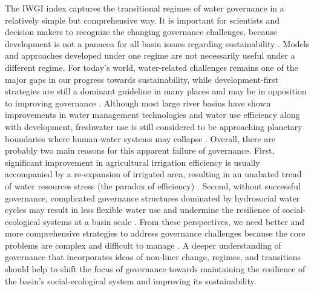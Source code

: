 \documentclass[9pt, twocolumn, twoside, lineno]{pnas-new}
\begin{document}
The IWGI index captures the transitional regimes of water governance in a relatively simple but comprehensive way.
It is important for scientists and decision makers to recognize the changing governance challenges, because development is not a panacea for all basin issues regarding sustainability 
\cite{cummingLinkingEconomicGrowth2018,reyersSocialEcologicalSystemsInsights2018}.
Models and approaches developed under one regime are not necessarily useful under a different regime.
For today's world, water-related challenges remains one of the major gaps in our progress towards sustainability, while development-first strategies are still a dominant guideline in many places and may be in opposition to improving governance 
\cite{xu2020,liu2017,greveGlobalAssessmentWater2018}. 
Although most large river basins have shown improvements in water management technologies and water use efficiency along with development, freshwater use is still considered to be approaching planetary boundaries where human-water systems may collapse 
\cite{li2020a,degraafEnvironmentalflowlimits2019,huggins2020}.
Overall, there are probably two main reasons for this apparent failure of governance.
First, significant improvement in agricultural irrigation efficiency is usually accompanied by a re-expansion of irrigated area, resulting in an unabated trend of water resources stress (the paradox of efficiency) 
\cite{grafton2018}. 
Second, without successful governance, complicated governance structures dominated by hydrosocial water cycles may result in less flexible water use and undermine the resilience of social-ecological systems at a basin scale
\cite{qinFlexibilityintensityglobal2019,levia2020,grill2019}.
From these perspectives, we need better and more comprehensive strategies to address governance challenges because the core problems are complex and difficult to manage 
\cite{steffen2020,muneepeerakul2020,bodinCollaborativeEnvironmentalGovernance2017,biermann2012}. 
A deeper understanding of governance that incorporates ideas of non-liner change, regimes, and transitions should help to shift the focus of governance towards maintaining the resilience of the basin’s social-ecological system and improving its sustainability.
\end{document}
